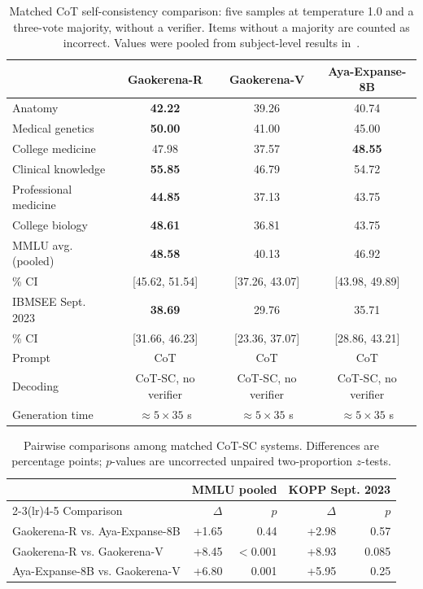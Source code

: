 \documentclass[manuscript,screen,review]{acmart}
\begin{document}
\begin{table}[ht]
\caption{Matched CoT self-consistency comparison: five samples at temperature 1.0 and a three-vote majority, without a verifier. Items without a majority are counted as incorrect. Values were pooled from subject-level results in~\cite{b2}.}\label{tab:cotsc}
\small
\begin{tabular}{@{}lccc@{}}
\toprule
 & Gaokerena-R & Gaokerena-V & Aya-Expanse-8B \\
\midrule
Anatomy & \textbf{42.22} & 39.26 & 40.74 \\
Medical genetics & \textbf{50.00} & 41.00 & 45.00 \\
College medicine & 47.98 & 37.57 & \textbf{48.55} \\
Clinical knowledge & \textbf{55.85} & 46.79 & 54.72 \\
Professional medicine & \textbf{44.85} & 37.13 & 43.75 \\
College biology & \textbf{48.61} & 36.81 & 43.75 \\
MMLU avg. (pooled) & \textbf{48.58} & 40.13 & 46.92 \\
\quad 95\% CI & [45.62, 51.54] & [37.26, 43.07] & [43.98, 49.89] \\
IBMSEE Sept. 2023 & \textbf{38.69} & 29.76 & 35.71 \\
\quad 95\% CI & [31.66, 46.23] & [23.36, 37.07] & [28.86, 43.21] \\
\midrule
Prompt & CoT & CoT & CoT \\
Decoding & CoT-SC, no verifier & CoT-SC, no verifier & CoT-SC, no verifier \\
Generation time & $\approx5\times35$ s & $\approx5\times35$ s & $\approx5\times35$ s \\
\bottomrule
\end{tabular}
\end{table}

\begin{table}[ht]
\caption{Pairwise comparisons among matched CoT-SC systems. Differences are percentage points; $p$-values are uncorrected unpaired two-proportion $z$-tests.}\label{tab:cotsc_sig}
\small
\begin{tabular}{@{}lrrrr@{}}
\toprule
 & \multicolumn{2}{c}{MMLU pooled} & \multicolumn{2}{c}{KOPP Sept. 2023} \\
\cmidrule(lr){2-3}\cmidrule(lr){4-5}
Comparison & $\Delta$ & $p$ & $\Delta$ & $p$ \\
\midrule
Gaokerena-R vs. Aya-Expanse-8B & +1.65 & 0.44 & +2.98 & 0.57 \\
Gaokerena-R vs. Gaokerena-V & +8.45 & $<0.001$ & +8.93 & 0.085 \\
Aya-Expanse-8B vs. Gaokerena-V & +6.80 & 0.001 & +5.95 & 0.25 \\
\bottomrule
\end{tabular}
\end{table}
\end{document}
